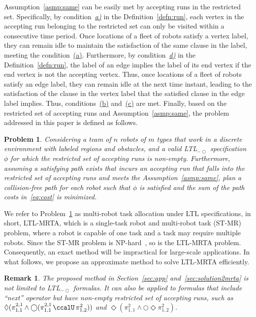 \documentclass[Afour,sageh,times]{sagej}
\newtheorem{problem}{Problem}
\newtheorem{rem}[thm]{Remark}
\newcommand{\ltl}{ {\it LTL}$_{-\bigcirc}$ }
\renewcommand{\ap}[3]{\mathcal{\pi}_{{#1},{#2}}^{#3}}
\begin{document}
Assumption~\ref{asmp:same} can be easily met by accepting runs in the restricted set. Specifically, by condition~\hyperref[cond:a]{\it a)} in the Definition~\ref{defn:run}, each vertex in the accepting run belonging to the restricted set can only be visited within a consecutive time period.  Once locations of a fleet of robots satisfy a  vertex label, they can remain idle to maintain the satisfaction of the same clause in the label, meeting the condition~\hyperref[asmp:a]{(a)}. Furthermore, by condition~\hyperref[cond:d]{\it d)} in the Definition~\ref{defn:run}, the label of an edge implies the label of its end vertex if the end vertex is not the accepting vertex. Thus, once locations of a fleet of  robots satisfy an edge label, they can remain idle at the next time instant, leading to the satisfaction of the clause in the vertex label that the satisfied clause in the edge label implies. Thus, conditions~\hyperref[asmp:b]{(b)} and~\hyperref[asmp:c]{(c)} are met. Finally, based on  the restricted set of accepting runs and Assumption~\ref{asmp:same}, the problem addressed in this paper is defined as follows.



\begin{problem}\label{prob:1}
Considering a team of $n$ robots of $m$ types that work in a discrete environment with labeled regions and obstacles, and a valid \ltl specification $\phi$ for which the restricted set of accepting runs is non-empty. Furthermore, assuming a satisfying path exists that incurs an accepting run that falls into the restricted set of accepting runs and meets the Assumption~\ref{asmp:same}, plan a collision-free path for each robot such that $\phi$ is satisfied and the sum of the path costs in~\eqref{eq:cost} is minimized.
\end{problem}

We refer to Problem~\ref{prob:1} as multi-robot task allocation under LTL specifications, in short, LTL-MRTA, which is a single-task robot and multi-robot task (ST-MR) problem, where a robot is capable of one task and a task may require multiple robots. Since the ST-MR problem is NP-hard~\cite{korsah2013comprehensive,nunes2017taxonomy}, so is the LTL-MRTA problem. Consequently, an exact method will be impractical for large-scale applications. In what follows, we propose an approximate method to solve LTL-MRTA efficiently.

\begin{rem}
The proposed method in Section~\ref{sec:app} and~\ref{sec:solution2mrta} is not limited to  LTL$_{-\bigcirc}$ formulas. It can also be applied to  formulas that include ``next'' operator but have non-empty restricted set of accepting runs, such as $\Diamond(\ap{1}{1}{2,1} \wedge \bigcirc (\ap{1}{1}{2,1} \,\ccalU\, \ap{1}{2}{2}))$ and $\Diamond (\ap{1}{1}{2}  \wedge \bigcirc \Diamond \ap{1}{2}{2})$.
\end{rem}
\end{document}
